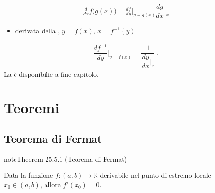 \documentclass[letterpaper,10pt,italian]{jupyterBook}
\begin{document}
\begin{equation}\label{equation:ch/infinitesimal_calculus/derivatives:infinitesimal-calculus:derivatives:rules:composite}
\begin{split}\frac{d}{dx} f\big( g(x) \big) = \frac{d f}{dy}\Big|_{y=g(x)} \dfrac{d g}{d x}\Big|_{x}\end{split}
\end{equation}\begin{itemize}
\item {} 
\sphinxAtStartPar
derivata della {\hyperref[\detokenize{ch/precalculus/real-functions:math-hs-precalculus-real-functions-inverse}]{}}, \(y = f(x)\), \(x = f^{-1}(y)\)

\end{itemize}
\begin{equation}\label{equation:ch/infinitesimal_calculus/derivatives:infinitesimal-calculus:derivatives:rules:inverse}
\begin{split} \dfrac{d f^{-1}}{d y}\bigg|_{y = f(x)} = \dfrac{1}{ \dfrac{d y}{d x}\bigg|_{x}} \ .\end{split}
\end{equation}
\sphinxAtStartPar
La {\hyperref[\detokenize{ch/infinitesimal_calculus/derivatives-notes:infinitesimal-calculus-derivatives-rules-notes}]{}} è disponibilie a fine capitolo.


\section{Teoremi}
\label{\detokenize{ch/infinitesimal_calculus/derivatives:teoremi}}\label{\detokenize{ch/infinitesimal_calculus/derivatives:infinitesimal-calculus-derivatives-thm}}

\subsection{Teorema di Fermat}
\label{\detokenize{ch/infinitesimal_calculus/derivatives:teorema-di-fermat}}\label{\detokenize{ch/infinitesimal_calculus/derivatives:infinitesimal-calculus-derivatives-thm-fermat}}\label{ch/infinitesimal_calculus/derivatives:thm:infinitesimal-calculus:derivatives:thm:fermat}
\begin{sphinxadmonition}{note}{Theorem 25.5.1 (Teorema di Fermat)}



\sphinxAtStartPar
Data la funzione \(f: (a,b) \rightarrow \mathbb{R}\) derivabile nel punto di estremo locale \(x_0 \in (a,b)\), allora \(f'(x_0) = 0\).
\end{sphinxadmonition}
\end{document}
